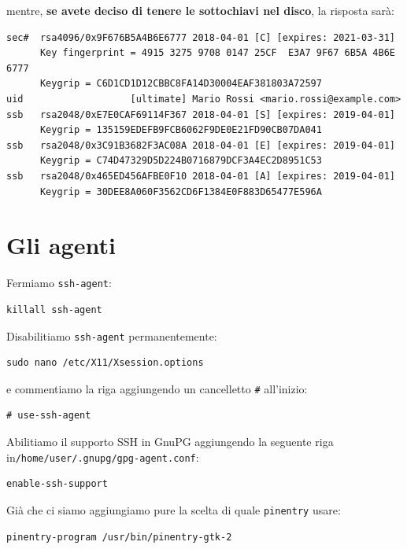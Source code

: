 \documentclass[a4paper,10pt]{article}
\begin{document}
mentre, \textbf{se avete deciso di tenere le sottochiavi nel disco}, la risposta sarà:

\begin{lstlisting}
sec#  rsa4096/0x9F676B5A4B6E6777 2018-04-01 [C] [expires: 2021-03-31]
      Key fingerprint = 4915 3275 9708 0147 25CF  E3A7 9F67 6B5A 4B6E 6777
      Keygrip = C6D1CD1D12CBBC8FA14D30004EAF381803A72597
uid                   [ultimate] Mario Rossi <mario.rossi@example.com>
ssb   rsa2048/0xE7E0CAF69114F367 2018-04-01 [S] [expires: 2019-04-01]
      Keygrip = 135159EDEFB9FCB6062F9DE0E21FD90CB07DA041
ssb   rsa2048/0x3C91B3682F3AC08A 2018-04-01 [E] [expires: 2019-04-01]
      Keygrip = C74D47329D5D224B0716879DCF3A4EC2D8951C53
ssb   rsa2048/0x465ED456AFBE0F10 2018-04-01 [A] [expires: 2019-04-01]
      Keygrip = 30DEE8A060F3562CD6F1384E0F883D65477E596A
\end{lstlisting}

\section{Gli agenti}

Fermiamo \texttt{ssh-agent}:

\begin{lstlisting}
killall ssh-agent
\end{lstlisting}

Disabilitiamo \texttt{ssh-agent} permanentemente:

\begin{lstlisting}
sudo nano /etc/X11/Xsession.options
\end{lstlisting}

e commentiamo la riga aggiungendo un cancelletto \texttt{\#} all'inizio:

\begin{lstlisting}
# use-ssh-agent
\end{lstlisting}

Abilitiamo il supporto SSH in GnuPG aggiungendo la seguente riga in\newline \texttt{/home/user/.gnupg/gpg-agent.conf}:

\begin{lstlisting}
enable-ssh-support
\end{lstlisting}

Già che ci siamo aggiungiamo pure la scelta di quale \texttt{pinentry} usare:

\begin{lstlisting}
pinentry-program /usr/bin/pinentry-gtk-2
\end{lstlisting}
\end{document}
